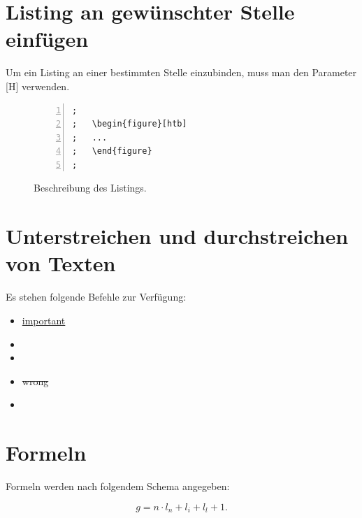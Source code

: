 \section{Listing an gewünschter Stelle einfügen}
\label{sec:FigurHierEinfuegen}
Um ein Listing an einer bestimmten Stelle einzubinden, muss man den Parameter [H] verwenden.

\FloatBarrier
\begin{figure}[htb]
\begin{lstlisting}[backgroundcolor={\color{white}},
basicstyle={\normalsize\sffamily},
breaklines=true,
frame={bottomline,topline, rightline},
language=HTML,
numbers=left,
showstringspaces=false,
xleftmargin=22pt]	
; 
;	\begin{figure}[htb]
;	...
;	\end{figure}
;
\end{lstlisting}
  \caption{Beschreibung des Listings.}
\label{lst:FigurGenauHier}
\end{figure}

\section{Unterstreichen und durchstreichen von Texten}
\label{sec:Durchstreichen}

Es stehen folgende Befehle zur Verfügung:\\

\begin{itemize}
\item \uline{important}  %
\item {}    %
\item {}       %
\item \sout{wrong}       %
\item {}     %
\end{itemize}


\section{Formeln}
\label{sec:Formeln}

Formeln werden nach folgendem Schema angegeben:

\begin{equation}
g = n\cdot l_n + l_i + l_l + 1.
\label{gle:Laenge}
\end{equation}




